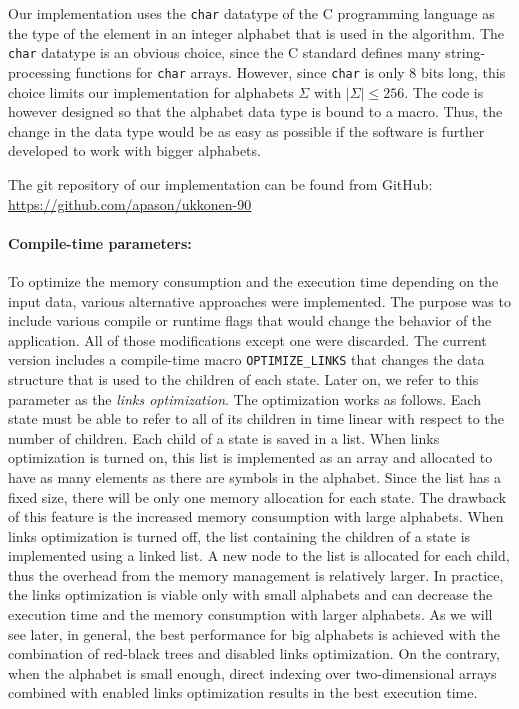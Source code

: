 \documentclass[english,twoside,censored,csm,algorithms-track-2020]{HYthesisML}
\theoremstyle{plain}
\theoremstyle{definition}
\begin{document}
Our implementation uses the \texttt{char} datatype of the C programming language as the
type of the element
in an integer alphabet that is used in the algorithm. The \texttt{char} datatype is an obvious
choice, since the C standard defines many string-processing functions for \texttt{char} arrays.
However, since \texttt{char} is only 8 bits long, this choice limits our implementation for alphabets
$\Sigma$ with $|\Sigma| \leq 256$. The code is however designed so that the alphabet data type
is bound to a macro. Thus, the change in the
data type would be as easy as possible if the software is further developed to work with
bigger alphabets. 

The git repository of our implementation can be found from GitHub:\\ \url{https://github.com/apason/ukkonen-90}

\paragraph{Compile-time parameters:}
To optimize the memory consumption and the execution time depending on the input data,
various alternative approaches were implemented.
The purpose was to include various compile or runtime flags that would change the behavior
of the application. All of those modifications except one were discarded. The current version includes
a compile-time macro \texttt{OPTIMIZE\_LINKS} that changes the data structure that is used to the children of each
state. Later on, we refer to this parameter as the {\em links optimization}. The optimization works as follows.
Each state must be able to refer to all of its children in time linear with respect to the number
of children.
Each child of a state is saved in a list. When links optimization is turned on, this list is
implemented as an array and allocated
to have as many elements as there are symbols in the alphabet. Since the list has a fixed size, there
will be only one memory allocation for each state. The drawback of this feature is the increased memory
consumption with large alphabets. When links optimization is turned off, the list containing the
children of a state is implemented using a linked list. A new node to the list is allocated for each
child, thus the overhead from the memory management is relatively larger. In practice, the links
optimization is viable only with small alphabets and can decrease the execution time and the memory
consumption with larger alphabets. As we will see later, in general, the best performance for big
alphabets
is achieved with the combination of red-black trees and disabled links optimization. On the contrary,
when the alphabet is small enough, direct indexing over two-dimensional arrays combined with
enabled links
optimization results in the best execution time.
\end{document}
